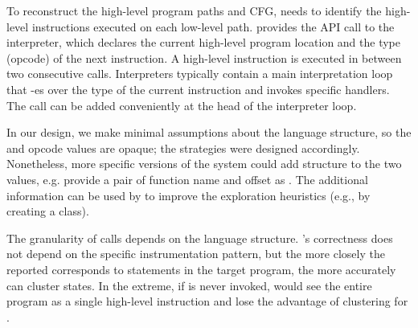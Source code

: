 To reconstruct the high-level program paths and CFG, \chef needs to identify the high-level instructions executed on each low-level path.  \chef provides the  API call to the interpreter, which declares the current high-level program location and the type (opcode) of the next instruction.  A high-level instruction is executed in between two consecutive  calls.
%
Interpreters typically contain a main interpretation loop that -es over the type of the current instruction and invokes specific handlers.  The  call can be added conveniently at the head of the interpreter loop.

In our design, we make minimal assumptions about the language structure, so the \hlpc and opcode values are opaque; the \cupa strategies were designed accordingly.  Nonetheless, more specific versions of the system could add structure to the two values, e.g. provide a pair of function name and offset as \hlpc.  The additional information can be used by \chef to improve the exploration heuristics (e.g., by creating a \cupa class).

The granularity of  calls depends on the language structure.  \chef's correctness does not depend on the specific instrumentation pattern, but the more closely the reported \hlpc corresponds to statements in the target program, the more accurately \cupa can cluster states. In the extreme, if  is never invoked, \chef would see the entire program as a single high-level instruction and lose the advantage of \cupa clustering for \hlpcs.

\fi

